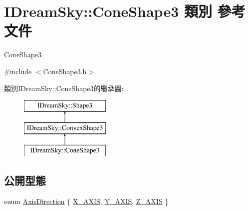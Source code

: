\hypertarget{class_i_dream_sky_1_1_cone_shape3}{}\section{I\+Dream\+Sky\+:\+:Cone\+Shape3 類別 參考文件}
\label{class_i_dream_sky_1_1_cone_shape3}


\hyperlink{class_i_dream_sky_1_1_cone_shape3}{Cone\+Shape3}.  




{\ttfamily \#include $<$Cone\+Shape3.\+h$>$}

類別\+I\+Dream\+Sky\+:\+:Cone\+Shape3的繼承圖\+:\begin{figure}[H]
\begin{center}
\leavevmode
\includegraphics[height=3.000000cm]{class_i_dream_sky_1_1_cone_shape3}
\end{center}
\end{figure}
\subsection*{公開型態}
\begin{DoxyCompactItemize}
\item 
enum \hyperlink{class_i_dream_sky_1_1_cone_shape3_a809826ad2cd704859238eb0ba5482ec4}{Axis\+Direction} \{ \hyperlink{class_i_dream_sky_1_1_cone_shape3_a809826ad2cd704859238eb0ba5482ec4a51f6fbb1283583801593fa3d75831dbc}{X\+\_\+\+A\+X\+IS}, 
\hyperlink{class_i_dream_sky_1_1_cone_shape3_a809826ad2cd704859238eb0ba5482ec4a253b9340f16fc670598b9145550458bd}{Y\+\_\+\+A\+X\+IS}, 
\hyperlink{class_i_dream_sky_1_1_cone_shape3_a809826ad2cd704859238eb0ba5482ec4a8955844ee61384c7246566e7ef3c89e7}{Z\+\_\+\+A\+X\+IS}
 \}
\end{DoxyCompactItemize}
